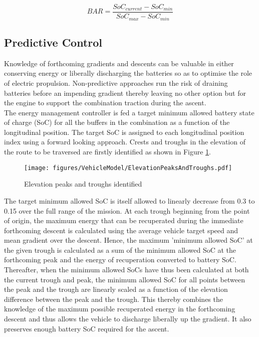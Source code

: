 \documentclass[MastersThesis.tex]{subfiles}
\begin{document}
\begin{equation} \label{eq:bar}
BAR = \frac{SoC_{current}-SoC_{min}}{SoC_{max}-SoC_{min}}
\end{equation}

\pagebreak

\subsection{Predictive Control} \label{sec:predcontrol}
Knowledge of forthcoming gradients and descents can be valuable in either conserving energy or liberally discharging the batteries so as to optimise the role of electric propulsion. Non-predictive approaches run the risk of draining batteries before an impending gradient thereby leaving no other option but for the engine to support the combination traction during the ascent.\\

The energy management controller is fed a target minimum allowed battery state of charge (SoC) for all the buffers in the combination as a function of the longitudinal position. The target SoC is assigned to each longitudinal position index using a forward looking approach. Crests and troughs in the elevation of the route to be traversed are firstly identified as shown in Figure \ref{elevationPeaksTroughs}. 

\begin{figure}[H]
	\begin{center}
		\texttt{[image: figures/VehicleModel/ElevationPeaksAndTroughs.pdf]}
	\end{center}
	\caption{Elevation peaks and troughs identified}
	\label{elevationPeaksTroughs}
\end{figure}

The target minimum allowed SoC is itself allowed to linearly decrease from 0.3 to 0.15 over the full range of the mission. At each trough beginning from the point of origin, the maximum energy that can be recuperated during the immediate forthcoming descent is calculated using the average vehicle target speed and mean gradient over the descent. Hence, the maximum 'minimum allowed SoC' at the given trough is calculated as a sum of the minimum allowed SoC at the forthcoming peak and the energy of recuperation converted to battery SoC.\\

Thereafter, when the minimum allowed SoCs have thus been calculated at both the current trough and peak, the minimum allowed SoC for all points between the peak and the trough are linearly scaled as a function of the elevation difference between the peak and the trough. This thereby combines the knowledge of the maximum possible recuperated energy in the forthcoming descent and thus allows the vehicle to discharge liberally up the gradient. It also preserves enough battery SoC required for the ascent.\\
\end{document}
